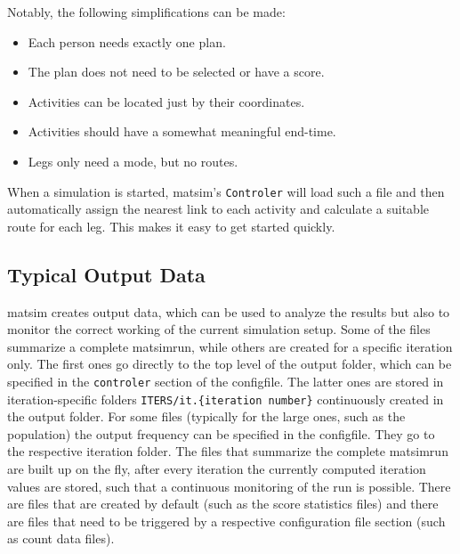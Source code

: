 Notably, the following simplifications can be made:
\begin{itemize}\styleItemize
\item Each person needs exactly one plan.
\item The plan does not need to be selected or have a score.
\item Activities can be located just by their coordinates.
\item Activities should have a somewhat meaningful end-time.
\item Legs only need a mode, but no routes.
\end{itemize}
When a simulation is started, \gls{matsim}'s \lstinline|Controler| will load such a file and then automatically assign the nearest link to each activity and calculate a suitable route for each leg. This makes it easy to get started quickly. 

\subsection{Typical Output Data}
\label{sec:outputdata}
\gls{matsim} creates
output data, which can be used to analyze the results but also to monitor the correct working of the current simulation setup. Some of the files summarize a complete \gls{matsimrun}, while others are created for a specific \gls{iteration} only. The first ones go directly to the top level of the output folder, which can be specified in the \lstinline|controler| section of the \gls{configfile}. The latter ones are stored in iteration-specific folders \lstinline|ITERS/it.{iteration number}| continuously created in the output folder. For some files (typically for the large ones, such as the population) the output frequency can be specified in the \gls{configfile}. They go to the respective iteration folder. The files that summarize the complete \gls{matsimrun} are built up on the fly, \ie after every iteration the currently computed iteration values are stored, such that a continuous monitoring of the run is possible. There are files that are created by default (such as the score statistics files) and there are files that need to be triggered by a respective configuration file section (such as count data files).



